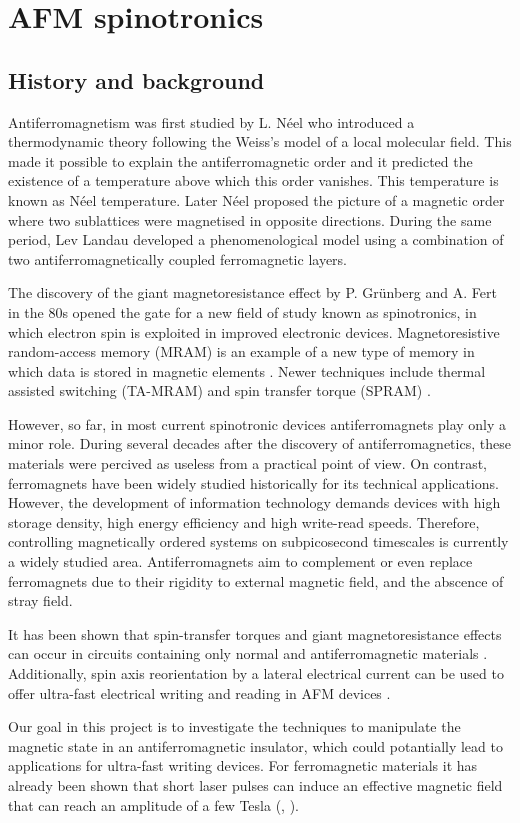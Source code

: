 \chapter{AFM spinotronics}

\section{History and background}

Antiferromagnetism was first studied by L. N\'eel who introduced a thermodynamic theory following the Weiss's model of a local molecular field. This made it possible to explain the antiferromagnetic order and it predicted the existence of a temperature above which this order vanishes. This temperature is known as N\'eel temperature. Later N\'eel proposed the picture of a magnetic order where two sublattices were magnetised in opposite directions. During the same period, Lev Landau developed a phenomenological model using a combination of two antiferromagnetically coupled ferromagnetic layers.

The discovery of the giant magnetoresistance effect by P. Grünberg \cite{Binasch1989} and A. Fert \cite{Baibich1988} in the 80s opened the gate for a new field of study known as spinotronics, in which electron spin is exploited in improved electronic devices. Magnetoresistive random-access memory (MRAM) is an example of a new type of memory in which data is stored in magnetic elements \citep{Akerman2005}. Newer techniques include thermal assisted switching (TA-MRAM) \citep{Bandiera2015} and spin transfer torque (SPRAM) \citep{Kawahara2012}.

However, so far, in most current spinotronic devices antiferromagnets play only a minor role. During several decades after the discovery of antiferromagnetics, these materials were percived as useless from a practical point of view. On contrast, ferromagnets have been widely studied historically for its technical applications. However, the development of information technology demands devices with high storage density, high energy efficiency and high write-read speeds. Therefore, controlling magnetically ordered systems on subpicosecond timescales is currently a widely studied area. Antiferromagnets aim to complement or even replace ferromagnets due to their rigidity to external magnetic field, and the abscence of stray field.

It has been shown that spin-transfer torques and giant magnetoresistance effects can occur in circuits containing only normal and antiferromagnetic materials \cite{MacDonald2011}. Additionally, spin axis reorientation by a lateral electrical current can be used to offer ultra-fast electrical writing and reading in AFM devices \cite{Zelezny2014}.

Our goal in this project is to investigate the techniques to manipulate the magnetic state in an antiferromagnetic insulator, which could potantially lead to applications for ultra-fast writing devices. For ferromagnetic materials it has already been shown that short laser pulses can induce an effective magnetic field that can reach an amplitude of a few Tesla (\cite{Qaiumzadeh2016}, \cite{Qaiumzadeh2013}).

